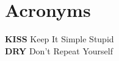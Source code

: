 \section*{Acronyms}

\begin{small}
    \noindent
    \textbf{KISS} Keep It Simple Stupid \\
    \textbf{DRY} Don't Repeat Yourself \\
\end{small}
